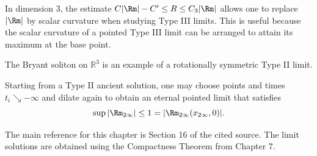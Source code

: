 \begin{remark}
\label{ch08-rem-type-iii-limits}

In dimension \(3\), the estimate \(C|\Rm|-C'\le R\le C_3|\Rm|\) allows one to replace \(|\Rm|\) by scalar curvature when studying Type III limits. This is useful because the scalar curvature of a pointed Type III limit can be arranged to attain its maximum at the base point.
\end{remark}

\begin{example}
\label{ch08-ex-bryant-soliton}

The Bryant soliton on \(\mathbb R^3\) is an example of a rotationally symmetric Type II limit.
\end{example}

\begin{remark}
\label{ch08-rem-third-dilation}

Starting from a Type II ancient solution, one may choose points and times \(t_i\searrow -\infty\) and dilate again to obtain an eternal pointed limit that satisfies
\[
\sup |\Rm_{2\infty}|\le 1 = |\Rm_{2\infty}(x_{2\infty},0)|.
\]
\end{remark}

\begin{remark}
\label{ch08-rem-notes-reference}
The main reference for this chapter is Section 16 of the cited source. The limit solutions are obtained using the Compactness Theorem from Chapter 7.
\end{remark}
